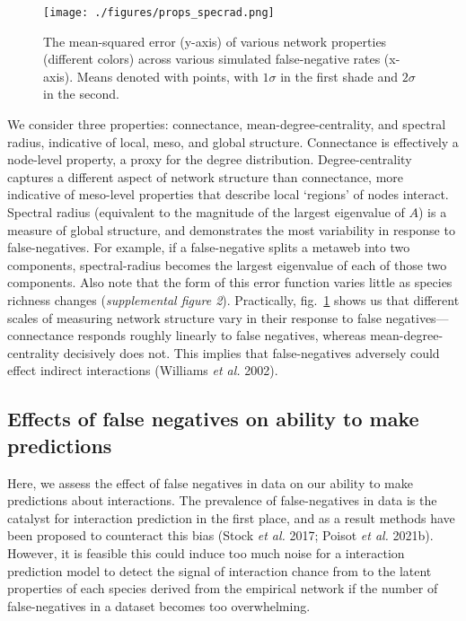 \documentclass[10pt,oneside]{article}
\begin{document}
\begin{figure}
\hypertarget{fig:properties}{%
\centering
\texttt{[image: ./figures/props\_specrad.png]}
\caption{The mean-squared error (y-axis) of various network properties
(different colors) across various simulated false-negative rates
(x-axis). Means denoted with points, with \(1\sigma\) in the first shade
and \(2\sigma\) in the second.}\label{fig:properties}
}
\end{figure}

We consider three properties: connectance, mean-degree-centrality, and
spectral radius, indicative of local, meso, and global structure.
Connectance is effectively a node-level property, a proxy for the degree
distribution. Degree-centrality captures a different aspect of network
structure than connectance, more indicative of meso-level properties
that describe local `regions' of nodes interact. Spectral radius
(equivalent to the magnitude of the largest eigenvalue of \(A\)) is a
measure of global structure, and demonstrates the most variability in
response to false-negatives. For example, if a false-negative splits a
metaweb into two components, spectral-radius becomes the largest
eigenvalue of each of those two components. Also note that the form of
this error function varies little as species richness changes
(\emph{supplemental figure 2}). Practically, fig.~\ref{fig:properties}
shows us that different scales of measuring network structure vary in
their response to false negatives---connectance responds roughly
linearly to false negatives, whereas mean-degree-centrality decisively
does not. This implies that false-negatives adversely could effect
indirect interactions (Williams \emph{et al.} 2002).

\hypertarget{effects-of-false-negatives-on-ability-to-make-predictions}{%
\subsection{Effects of false negatives on ability to make
predictions}\label{effects-of-false-negatives-on-ability-to-make-predictions}}

Here, we assess the effect of false negatives in data on our ability to
make predictions about interactions. The prevalence of false-negatives
in data is the catalyst for interaction prediction in the first place,
and as a result methods have been proposed to counteract this bias
(Stock \emph{et al.} 2017; Poisot \emph{et al.} 2021b). However, it is
feasible this could induce too much noise for a interaction prediction
model to detect the signal of interaction chance from to the latent
properties of each species derived from the empirical network if the
number of false-negatives in a dataset becomes too overwhelming.
\end{document}
